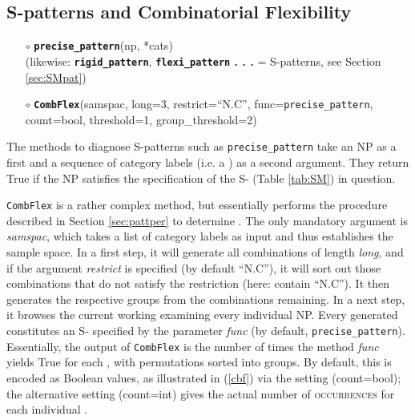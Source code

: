 \documentclass[output=paper,colorlinks,citecolor=brown,draft]{langscibook}
\begin{document}
\subsection*{S-patterns and Combinatorial Flexibility}


\begin{enumerate} 

    \item[$\circ$] \textbf{\texttt{precise\_pattern}}(np, *cats)  \\ \hfill (likewise:  \textbf{\texttt{rigid\_pattern}}, \textbf{\texttt{flexi\_pattern} . . .} \hfill = S-patterns, see Section \ref{sec:SMpat})

    \item[$\circ$] \textbf{\texttt{CombFlex}}(samspac, long=3, restrict=``N.C'', func=\texttt{precise\_pattern}, \\  \phantom{.} \hfill count=bool, threshold=1, group\_threshold=2) 

\end{enumerate}

The methods to diagnose  S-patterns such as \texttt{precise\_pattern} take an NP as a first and a sequence of category labels (i.e. a ) as a second argument. They return True if the NP  satisfies the  specification of the  S- (Table \ref{tab:SM}) in question. 

\texttt{CombFlex} is a rather complex method, but essentially performs the procedure described in Section \ref{sec:pattper} to determine . The only mandatory argument is   \textit{samspac}, which takes a list of category labels as input and thus establishes the sample space. In a first step, it will generate all combinations of length \textit{long}, and if the argument \textit{restrict} is specified (by default ``N.C''), it will sort out those combinations that do not satisfy the restriction (here: contain ``N.C''). It then generates the respective  groups from the combinations remaining. In a next step, it browses the current working  examining every individual NP. Every  generated constitutes an S- specified by the parameter \textit{func} (by default, \texttt{precise\_pattern}). Essentially, the output of \texttt{CombFlex} is the number of times the method \textit{func} yields True for each , with permutations sorted into  groups. By default, this is encoded as Boolean values, as illustrated in (\ref{cbf}) via the setting (count=bool); the alternative setting (count=int) gives the actual number of \textsc{occurrences} for each individual . 
\end{document}
